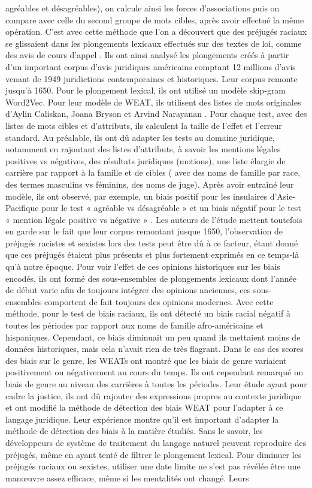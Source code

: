 \documentclass{article}
\begin{document}
agréables et désagréables), on calcule ainsi les forces d’associations puis on compare avec celle du second groupe de mots cibles, après avoir effectué la même opération. C’est avec cette méthode que l’on a découvert que des préjugés raciaux se glissaient dans les plongements lexicaux effectués sur des textes de loi, comme des avis de cours d’appel \cite{matthews2022gender}. Ils ont ainsi analysé les plongements créés à partir d’un important corpus d’avis juridiques américains comptant 12 millions d’avis venant de 1949 juridictions contemporaines et historiques. Leur corpus remonte jusqu’à 1650. Pour le plongement lexical, ils ont utilisé un  modèle skip-gram Word2Vec. Pour leur modèle de WEAT, ils utilisent des listes de mots originales d’Aylin Caliskan, Joana Bryson et Arvind Narayanan \cite{caliskan2017semantics}. Pour chaque test, avec des listes de mots cibles et d’attributs, ils calculent la taille de l’effet et l’erreur standard. Au préalable, ils ont dû adapter les tests au domaine juridique, notamment en rajoutant des listes d’attributs, à savoir les mentions légales positives vs négatives, des résultats juridiques (motions), une liste élargie de carrière par rapport à la famille et de cibles ( avec des noms de famille par race, des termes masculins vs féminins, des noms de juge). Après avoir entraîné leur modèle, ils ont observé, par exemple, un biais positif pour les insulaires d’Asie-Pacifique pour le test « agréable vs désagréable » et un biais négatif pour le test « mention légale positive vs négative » \cite{matthews2022gender}. Les auteurs de l’étude mettent toutefois en garde sur le fait que leur corpus remontant jusque 1650, l’observation de préjugés racistes et sexistes lors des tests peut être dû à ce facteur, étant donné que ces préjugés étaient plus présents et plus fortement exprimés en ce temps-là qu’à notre époque. Pour voir l’effet de ces opinions historiques sur les biais encodés, ils ont formé des sous-ensembles de plongements lexicaux dont l’année de début varie afin de toujours intégrer des opinions anciennes, ces sous-ensembles comportent de fait toujours des opinions modernes. Avec cette méthode, pour le test de biais raciaux, ils ont détecté un biais racial négatif à toutes les périodes par rapport aux noms de famille afro-américains et hispaniques. Cependant, ce biais diminuait un peu quand ils mettaient moins de données historiques, mais cela n’avait rien de très flagrant. Dans le cas des scores des biais sur le genre, les WEATs ont montré que les biais de genre variaient positivement ou négativement au cours du temps. Ils ont cependant remarqué un biais de genre au niveau des carrières à toutes les périodes. Leur étude ayant pour cadre la justice, ils ont dû rajouter des expressions propres au contexte juridique et ont modifié la méthode de détection des biais WEAT pour l’adapter à ce langage juridique. Leur expérience montre qu’il est important d’adapter la méthode de détection des biais à la matière étudiés. Sans le savoir, les développeurs de système de traitement du langage naturel peuvent reproduire des préjugés, même en ayant tenté de filtrer le plongement lexical. Pour diminuer les préjugés raciaux ou sexistes, utiliser une date limite ne s’est pas révélée être une manœuvre assez efficace, même si les mentalités ont changé. Leurs 
\end{document}
